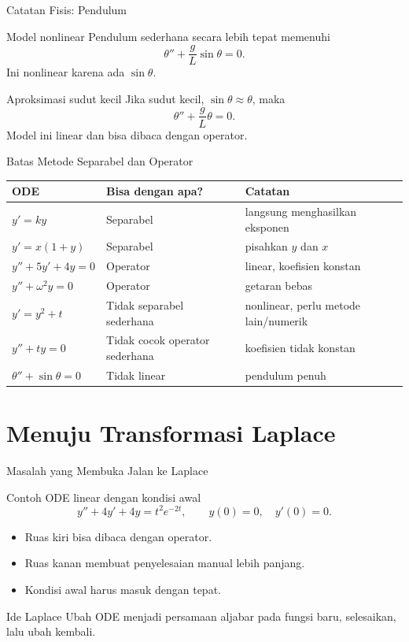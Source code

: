 \documentclass[aspectratio=169,11pt]{beamer}
\begin{document}
\begin{frame}{Catatan Fisis: Pendulum}
\begin{block}{Model nonlinear}
Pendulum sederhana secara lebih tepat memenuhi
\[
\theta''+\frac{g}{L}\sin\theta=0.
\]
Ini nonlinear karena ada $\sin\theta$.
\end{block}
\begin{block}{Aproksimasi sudut kecil}
Jika sudut kecil, $\sin\theta\approx\theta$, maka
\[
\theta''+\frac{g}{L}\theta=0.
\]
Model ini linear dan bisa dibaca dengan operator.
\end{block}
\end{frame}

\begin{frame}{Batas Metode Separabel dan Operator}
\scriptsize
\begin{tabular}{p{4.0cm}p{3.1cm}p{4.0cm}}
\toprule
\textbf{ODE} & \textbf{Bisa dengan apa?} & \textbf{Catatan} \\
\midrule
$y'=ky$ & Separabel & langsung menghasilkan eksponen \\
$y'=x(1+y)$ & Separabel & pisahkan $y$ dan $x$ \\
$y''+5y'+4y=0$ & Operator & linear, koefisien konstan \\
$y''+\omega^2y=0$ & Operator & getaran bebas \\
$y'=y^2+t$ & Tidak separabel sederhana & nonlinear, perlu metode lain/numerik \\
$y''+t y=0$ & Tidak cocok operator sederhana & koefisien tidak konstan \\
$\theta''+\sin\theta=0$ & Tidak linear & pendulum penuh \\
\bottomrule
\end{tabular}
\end{frame}

\section{Menuju Transformasi Laplace}

\begin{frame}{Masalah yang Membuka Jalan ke Laplace}
\begin{block}{Contoh ODE linear dengan kondisi awal}
\[
 y''+4y'+4y=t^2e^{-2t}, \qquad y(0)=0,\quad y'(0)=0.
\]
\end{block}
\begin{itemize}
  \item Ruas kiri bisa dibaca dengan operator.
  \item Ruas kanan membuat penyelesaian manual lebih panjang.
  \item Kondisi awal harus masuk dengan tepat.
\end{itemize}
\begin{alertblock}{Ide Laplace}
Ubah ODE menjadi persamaan aljabar pada fungsi baru, selesaikan, lalu ubah kembali.
\end{alertblock}
\end{frame}
\end{document}
